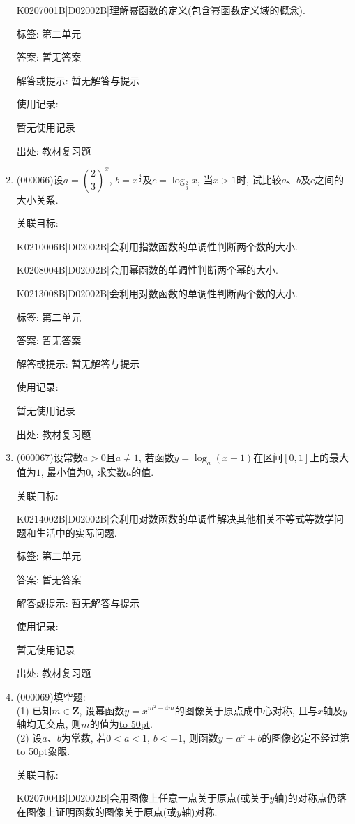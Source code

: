 \documentclass[10pt,a4paper]{article}
\newcommand{\blank}[1]{\underline{\hbox to #1pt{}}}
\begin{document}
\begin{enumerate}[1.]
K0207001B|D02002B|理解幂函数的定义(包含幂函数定义域的概念).



标签: 第二单元

答案: 暂无答案

解答或提示: 暂无解答与提示

使用记录:

暂无使用记录


出处: 教材复习题
\item { (000066)}设$a=(\dfrac 23)^x$, $b=x^{\frac 32}$及$c=\log_\frac{2}{3}x$, 当$x>1$时, 试比较$a$、$b$及$c$之间的大小关系.


关联目标:

K0210006B|D02002B|会利用指数函数的单调性判断两个数的大小.

K0208004B|D02002B|会用幂函数的单调性判断两个幂的大小.

K0213008B|D02002B|会利用对数函数的单调性判断两个数的大小.



标签: 第二单元

答案: 暂无答案

解答或提示: 暂无解答与提示

使用记录:

暂无使用记录


出处: 教材复习题
\item { (000067)}设常数$a>0$且$a\ne 1$, 若函数$y=\log_a(x+1)$在区间$[0, 1]$上的最大值为$1$, 最小值为$0$, 求实数$a$的值.


关联目标:

K0214002B|D02002B|会利用对数函数的单调性解决其他相关不等式等数学问题和生活中的实际问题.



标签: 第二单元

答案: 暂无答案

解答或提示: 暂无解答与提示

使用记录:

暂无使用记录


出处: 教材复习题
\item { (000069)}填空题:\\
(1) 已知$m\in \mathbf{Z}$, 设幂函数$y=x^{m^2-4m}$的图像关于原点成中心对称, 且与$x$轴及$y$轴均无交点, 则$m$的值为\blank{50}.\\
(2) 设$a$、$b$为常数, 若$0<a<1$, $b<-1$, 则函数$y=a^x+b$的图像必定不经过第\blank{50}象限.


关联目标:

K0207004B|D02002B|会用图像上任意一点关于原点(或关于$y$轴)的对称点仍落在图像上证明函数的图像关于原点(或$y$轴)对称.


\end{enumerate}
\end{document}
